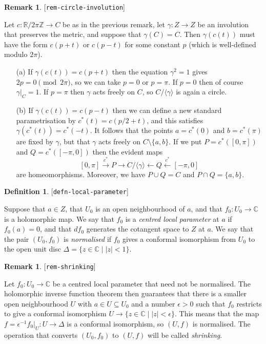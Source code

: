 \documentclass[reqno]{amsart}
\newcommand{\lbl}[1]{\label{#1}\textup{[\texttt{#1}]}\par}
\newcommand{\lbl}{\label}
\newcommand{\Dl}        {\Delta}
\newcommand{\gm}        {\gamma}
\newcommand{\ep}        {\epsilon}
\newcommand{\xla}       {\xleftarrow}
\newcommand{\xra}       {\xrightarrow}
\newcommand{\Z}         {{\mathbb{Z}}}
\newcommand{\R}         {{\mathbb{R}}}
\newcommand{\C}         {{\mathbb{C}}}
\newcommand{\ip}[1]     {\langle #1\rangle}
\newcommand{\st}        {\;|\;}
\newcommand{\sm}        {\setminus}
\newcommand{\sse}       {\subseteq}
\renewcommand{\:}{\colon}
\theoremstyle{definition}
\newtheorem{remark}[theorem]{Remark}
\newtheorem{definition}[theorem]{Definition}
\begin{document}
\begin{remark}\lbl{rem-circle-involution}
 Let $c\:\R/2\pi\Z\to C$ be as in the previous remark, let
 $\gm\:Z\to Z$ be an involution that preserves the metric, and suppose
 that $\gm(C)=C$.  Then $\gm(c(t))$ must have the form $c(p+t)$ or
 $c(p-t)$ for some constant $p$ (which is well-defined modulo
 $2\pi$).
 \begin{itemize}
  \item[(a)] If $\gm(c(t))=c(p+t)$ then the equation $\gm^2=1$ gives
   $2p=0\pmod{2\pi}$, so we can take $p=0$ or $p=\pi$.  If $p=0$ then
   of course $\gm|_C=1$.  If $p=\pi$ then $\gm$ acts freely on $C$, so
   $C/\ip{\gm}$ is again a circle.
  \item[(b)] If $\gm(c(t))=c(p-t)$ then we can define a new standard
   parametrisation by $c^*(t)=c(p/2+t)$, and this satisfies
   $\gm(c^*(t))=c^*(-t)$.  It follows that the points $a=c^*(0)$ and
   $b=c^*(\pi)$ are fixed by $\gm$, but that $\gm$ acts freely on
   $C\sm\{a,b\}$.  If we put $P=c^*([0,\pi])$ and $Q=c^*([-\pi,0])$
   then the evident maps
   \[ [0,\pi] \xra{c^*} P \xra{} C/\ip{\gm}
       \xla{} Q \xla{c^*} [-\pi,0]
   \]
   are homeomorphisms.  Moreover, we have $P\cup Q=C$ and
   $P\cap Q=\{a,b\}$.
 \end{itemize}
\end{remark}

\begin{definition}\lbl{defn-local-parameter}
 Suppose that $a\in Z$, that $U_0$ is an open neighbourhood of $a$,
 and that $f_0\:U_0\to\C$ is a holomorphic map.  We say that $f_0$ is
 a \emph{centred local parameter} at $a$ if $f_0(a)=0$, and that
 $df_0$ generates the cotangent space to $Z$ at $a$.  We say that the
 pair $(U_0,f_0)$ is \emph{normalised} if $f_0$ gives a conformal
 isomorphism from $U_0$ to the open unit disc $\Dl=\{z\in\C\st |z|<1\}$.
\end{definition}

\begin{remark}\lbl{rem-shrinking}
 Let $f_0\:U_0\to\C$ be a centred local parameter that need not be
 normalised.  The holomorphic inverse function theorem then guarantees
 that there is a smaller open neighbourhood $U$ with $a\in U\sse U_0$
 and a number $\ep>0$ such that $f_0$ restricts to give a conformal
 isomorphism $U\to\{z\in\C\st |z|<\ep\}$.  This means that the map
 $f=\ep^{-1}f_0|_U\:U\to\Dl$ is a conformal isomorphism, so $(U,f)$ is
 normalised.  The operation that converts $(U_0,f_0)$ to $(U,f)$ will
 be called \emph{shrinking}.
\end{remark}
\end{document}
